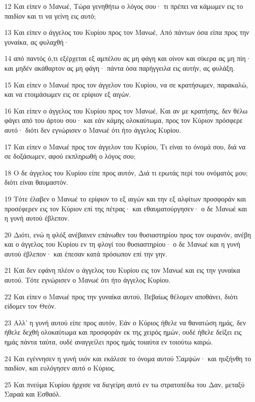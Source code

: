 \par 12 Και είπεν ο Μανωέ, Τώρα γενηθήτω ο λόγος σου· τι πρέπει να κάμωμεν εις το παιδίον και τι να γείνη εις αυτό;
\par 13 Και είπεν ο άγγελος του Κυρίου προς τον Μανωέ, Από πάντων όσα είπα προς την γυναίκα, ας φυλαχθή·
\par 14 από παντός ό,τι εξέρχεται εξ αμπέλου ας μη φάγη και οίνον και σίκερα ας μη πίη· και μηδέν ακάθαρτον ας μη φάγη· πάντα όσα παρήγγειλα εις αυτήν, ας φυλάξη.
\par 15 Και είπεν ο Μανωέ προς τον άγγελον του Κυρίου, να σε κρατήσωμεν, παρακαλώ, και να ετοιμάσωμεν εις σε ερίφιον εξ αιγών.
\par 16 Και είπεν ο άγγελος του Κυρίου προς τον Μανωέ, Και αν με κρατήσης, δεν θέλω φάγει από του άρτου σου· και εάν κάμης ολοκαύτωμα, προς τον Κύριον πρόσφερε αυτό· διότι δεν εγνώρισεν ο Μανωέ ότι ήτο άγγελος Κυρίου.
\par 17 Και είπεν ο Μανωέ προς τον άγγελον του Κυρίου, Τι είναι το όνομά σου, διά να σε δοξάσωμεν, αφού εκπληρωθή ο λόγος σου;
\par 18 Ο δε άγγελος του Κυρίου είπε προς αυτόν, Διά τι ερωτάς περί του ονόματός μου; διότι είναι θαυμαστόν.
\par 19 Τότε έλαβεν ο Μανωέ το ερίφιον το εξ αιγών και την εξ αλφίτων προσφοράν και προσέφερεν εις τον Κύριον επί της πέτρας· και εθαυματούργησεν· ο δε Μανωέ και η γυνή αυτού έβλεπον.
\par 20 Διότι, ενώ η φλόξ ανέβαινεν επάνωθεν του θυσιαστηρίου προς τον ουρανόν, ανέβη και ο άγγελος του Κυρίου εν τη φλογί του θυσιαστηρίου· ο δε Μανωέ και η γυνή αυτού έβλεπον· και έπεσαν κατά πρόσωπον επί την γην.
\par 21 Και δεν εφάνη πλέον ο άγγελος του Κυρίου εις τον Μανωέ και εις την γυναίκα αυτού. Τότε εγνώρισεν ο Μανωέ ότι ήτο άγγελος Κυρίου.
\par 22 Και είπεν ο Μανωέ προς την γυναίκα αυτού, Βεβαίως θέλομεν αποθάνει, διότι είδομεν τον Θεόν.
\par 23 Αλλ' η γυνή αυτού είπε προς αυτόν, Εάν ο Κύριος ήθελε να θανατώση ημάς, δεν ήθελε δεχθή ολοκαύτωμα και προσφοράν εκ της χειρός ημών, ουδέ ήθελε δείξει εις ημάς πάντα ταύτα, ουδέ αναγγείλει προς ημάς τοιαύτα εν τοιούτω καιρώ.
\par 24 Και εγέννησεν η γυνή υιόν και εκάλεσε το όνομα αυτού Σαμψών· και ηυξήνθη το παιδίον, και ευλόγησεν αυτό ο Κύριος.
\par 25 Και πνεύμα Κυρίου ήρχισε να διεγείρη αυτό εν τω στρατοπέδω του Δαν, μεταξύ Σαραά και Εσθαόλ.

